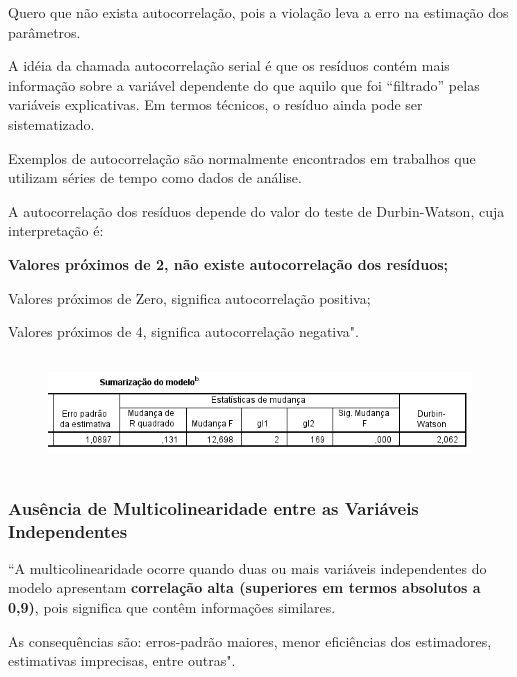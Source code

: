 			\bigskip

			Quero que não exista autocorrelação, pois a violação leva a erro na estimação dos parâmetros.
			
			\bigskip
			
			A idéia da chamada autocorrelação serial é que os resíduos
contém mais informação sobre a variável dependente do que aquilo que foi “filtrado” pelas variáveis explicativas. Em termos técnicos, o resíduo ainda pode ser sistematizado.

			\bigskip

			Exemplos de autocorrelação são normalmente encontrados em trabalhos que utilizam séries de tempo como dados de análise.
			
			\bigskip
			
			A autocorrelação dos resíduos depende do valor do teste de Durbin-Watson, cuja interpretação é:
			
			\bigskip
			
			\textbf{Valores próximos de 2, não existe autocorrelação dos resíduos;}
			
			\bigskip
			
			Valores próximos de Zero, significa autocorrelação positiva;
			
			Valores próximos de 4, significa autocorrelação negativa". \cite{torres}

			\begin{figure}[H]
				\centering
				\includegraphics[height=3cm]{images/rl_durbin-watson}
			\end{figure}

		\subsubsection{Ausência de Multicolinearidade entre as Variáveis Independentes}

			``A multicolinearidade ocorre quando duas ou mais variáveis independentes do modelo apresentam \textbf{correlação alta (superiores em termos absolutos a 0,9)}, pois significa que contêm informações similares.
			
			\bigskip
			
			As consequências são: erros-padrão maiores, menor eficiências dos estimadores, estimativas imprecisas, entre outras". \cite{torres}

